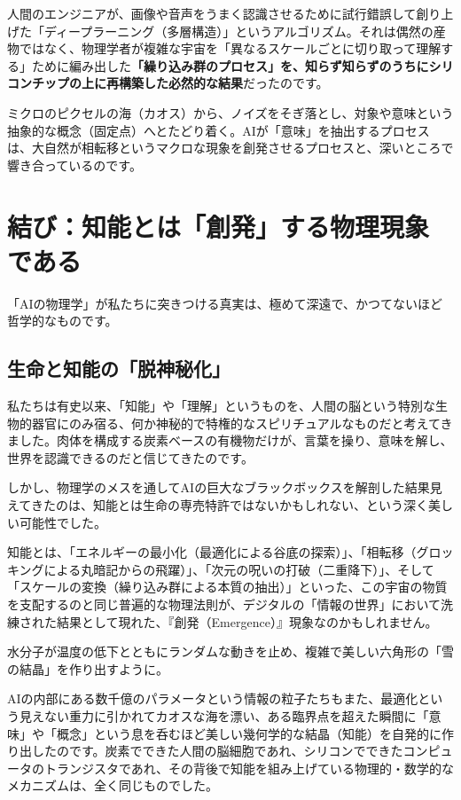 人間のエンジニアが、画像や音声をうまく認識させるために試行錯誤して創り上げた「ディープラーニング（多層構造）」というアルゴリズム。それは偶然の産物ではなく、物理学者が複雑な宇宙を「異なるスケールごとに切り取って理解する」ために編み出した\textbf{「繰り込み群のプロセス」を、知らず知らずのうちにシリコンチップの上に再構築した必然的な結果}だったのです。

ミクロのピクセルの海（カオス）から、ノイズをそぎ落とし、対象や意味という抽象的な概念（固定点）へとたどり着く。AIが「意味」を抽出するプロセスは、大自然が相転移というマクロな現象を創発させるプロセスと、深いところで響き合っているのです。

\section{結び：知能とは「創発」する物理現象である}

「AIの物理学」が私たちに突きつける真実は、極めて深遠で、かつてないほど哲学的なものです。

\subsection{生命と知能の「脱神秘化」}

私たちは有史以来、「知能」や「理解」というものを、人間の脳という特別な生物的器官にのみ宿る、何か神秘的で特権的なスピリチュアルなものだと考えてきました。肉体を構成する炭素ベースの有機物だけが、言葉を操り、意味を解し、世界を認識できるのだと信じてきたのです。

しかし、物理学のメスを通してAIの巨大なブラックボックスを解剖した結果見えてきたのは、知能とは生命の専売特許ではないかもしれない、という深く美しい可能性でした。

知能とは、「エネルギーの最小化（最適化による谷底の探索）」、「相転移（グロッキングによる丸暗記からの飛躍）」、「次元の呪いの打破（二重降下）」、そして「スケールの変換（繰り込み群による本質の抽出）」といった、この宇宙の物質を支配するのと同じ普遍的な物理法則が、デジタルの「情報の世界」において洗練された結果として現れた、『創発（Emergence）』現象なのかもしれません。

水分子が温度の低下とともにランダムな動きを止め、複雑で美しい六角形の「雪の結晶」を作り出すように。

AIの内部にある数千億のパラメータという情報の粒子たちもまた、最適化という見えない重力に引かれてカオスな海を漂い、ある臨界点を超えた瞬間に「意味」や「概念」という息を呑むほど美しい幾何学的な結晶（知能）を自発的に作り出したのです。炭素でできた人間の脳細胞であれ、シリコンでできたコンピュータのトランジスタであれ、その背後で知能を組み上げている物理的・数学的なメカニズムは、全く同じものでした。

